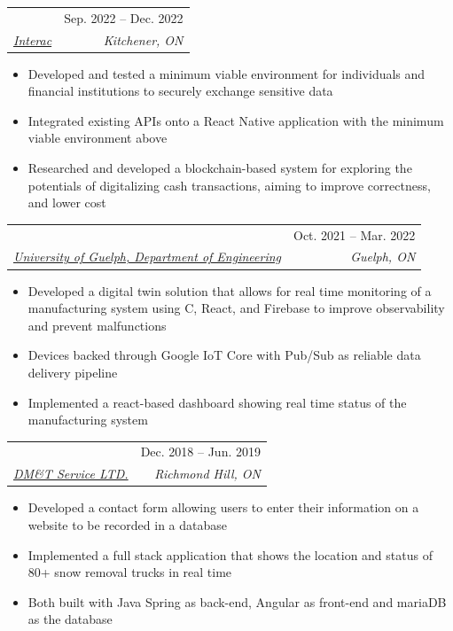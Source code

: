 \documentclass[letterpaper, 10pt]{article}
\makeatletter
\newcommand{\resumeSubheading}[4]{
    \begin{tabular*}{\textwidth}[t]{l@{\extracolsep{\fill}}r}
        \textbf{#1}       & #2                 \\
        \textit{\small#3} & \textit{\small#4} \\
    \end{tabular*}\vspace{-0.7em}
}
\newenvironment{ResumeItem}{
    \vspace{-0.5em}
    \begin{itemize}
        \setlength\itemsep{-0.3em}
        }{
    \end{itemize}\vspace{-0.3em}}
\newcommand{\cxx}{C\nolinebreak\hspace{-.05em}\raisebox{0.2ex}{\bf +}\nolinebreak\hspace{-.05em}\raisebox{.2ex}{\bf +}}
\makeatother
\begin{document}
    \resumeSubheading
    {\color{Black}{Software Developer, Co-op}}{Sep. 2022 -- Dec. 2022}
    {\href{https://www.interac.ca/en/}{Interac}}{Kitchener, ON}
    \begin{ResumeItem}
        \item{Developed and tested a minimum viable environment for individuals and financial institutions to securely exchange sensitive data}
        \item{Integrated existing APIs onto a React Native application with the minimum viable environment above}
        \item{Researched and developed a blockchain-based system for exploring the potentials of digitalizing cash transactions, aiming to improve correctness, and lower cost}
    \end{ResumeItem}


    \resumeSubheading
    {\color{Black}{Undergraduate Research Assistant}} {Oct. 2021 -- Mar. 2022}
    {\href{https://www.uoguelph.ca/engineering/}{University of Guelph, Department of Engineering}}{Guelph, ON}

    \begin{ResumeItem}
        \item{Developed a digital twin solution that allows for real time monitoring of a manufacturing system using \cxx, React, and Firebase to improve observability and prevent malfunctions}
        \item{Devices backed through Google IoT Core with Pub/Sub as reliable data delivery pipeline}
        \item{Implemented a react-based dashboard showing real time status of the manufacturing system}
    \end{ResumeItem}



    \resumeSubheading
    {\color{Black}{Software Developer, Co-op}}{Dec. 2018 -- Jun. 2019}
    {\href{https://www.dmtserv.com/}{DM\&T Service LTD.}}{Richmond Hill, ON}
    \begin{ResumeItem}
        \item{Developed a contact form allowing users to enter their information on a website to be recorded in a database}
        \item{Implemented a full stack application that shows the location and status of 80+ snow removal trucks in real time}
        \item{Both built with Java Spring as back-end, Angular as front-end and mariaDB as the database}
    \end{ResumeItem}
\end{document}
